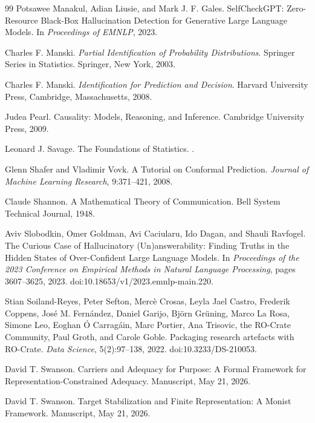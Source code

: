 \documentclass[11pt]{article}
\theoremstyle{definition}
\theoremstyle{remark}
\begin{document}
\begin{thebibliography}{99}
Potsawee Manakul, Adian Liusie, and Mark J. F. Gales.
\newblock SelfCheckGPT: Zero-Resource Black-Box Hallucination Detection for Generative Large Language Models.
\newblock In \emph{Proceedings of EMNLP}, 2023.

Charles F. Manski.
\newblock \emph{Partial Identification of Probability Distributions}.
\newblock Springer Series in Statistics. Springer, New York, 2003.

Charles F. Manski.
\newblock \emph{Identification for Prediction and Decision}.
\newblock Harvard University Press, Cambridge, Massachusetts, 2008.

Judea Pearl.
\newblock Causality: Models, Reasoning, and Inference.
\newblock Cambridge University Press, 2009.

Leonard J. Savage.
\newblock The Foundations of Statistics.
.

Glenn Shafer and Vladimir Vovk.
\newblock A Tutorial on Conformal Prediction.
\newblock \emph{Journal of Machine Learning Research}, 9:371--421, 2008.

Claude Shannon.
\newblock A Mathematical Theory of Communication.
\newblock Bell System Technical Journal, 1948.

Aviv Slobodkin, Omer Goldman, Avi Caciularu, Ido Dagan, and Shauli Ravfogel.
\newblock The Curious Case of Hallucinatory (Un)answerability: Finding Truths in the Hidden States of Over-Confident Large Language Models.
\newblock In \emph{Proceedings of the 2023 Conference on Empirical Methods in Natural Language Processing}, pages 3607--3625, 2023.
\newblock doi:10.18653/v1/2023.emnlp-main.220.

Stian Soiland-Reyes, Peter Sefton, Merc\`e Crosas, Leyla Jael Castro,
Frederik Coppens, Jos\'e M. Fern\'andez, Daniel Garijo, Bj\"orn Gr\"uning,
Marco La Rosa, Simone Leo, Eoghan \'O Carrag\'ain, Marc Portier,
Ana Trisovic, the RO-Crate Community, Paul Groth, and Carole Goble.
\newblock Packaging research artefacts with RO-Crate.
\newblock \emph{Data Science}, 5(2):97--138, 2022.
\newblock doi:10.3233/DS-210053.

David T. Swanson.
\newblock Carriers and Adequacy for Purpose: A Formal Framework for Representation-Constrained Adequacy.
\newblock Manuscript, May 21, 2026.

David T. Swanson.
\newblock Target Stabilization and Finite Representation: A Monist Framework.
\newblock Manuscript, May 21, 2026.


\end{thebibliography}
\end{document}
